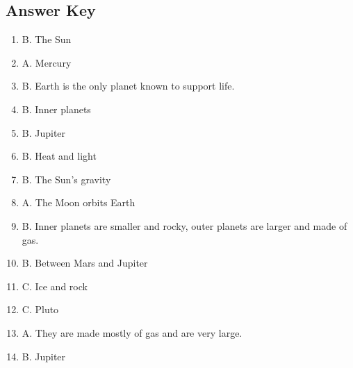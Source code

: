 \documentclass[12pt]{article}
\begin{document}
\subsection*{Answer Key}

\begin{enumerate}
    \item B. The Sun
    \item A. Mercury
    \item B. Earth is the only planet known to support life.
    \item B. Inner planets
    \item B. Jupiter
    \item B. Heat and light
    \item B. The Sun's gravity
    \item A. The Moon orbits Earth
    \item B. Inner planets are smaller and rocky, outer planets are larger and made of gas.
    \item B. Between Mars and Jupiter
    \item C. Ice and rock
    \item C. Pluto
    \item A. They are made mostly of gas and are very large.
    \item B. Jupiter
\end{enumerate}
\end{document}
